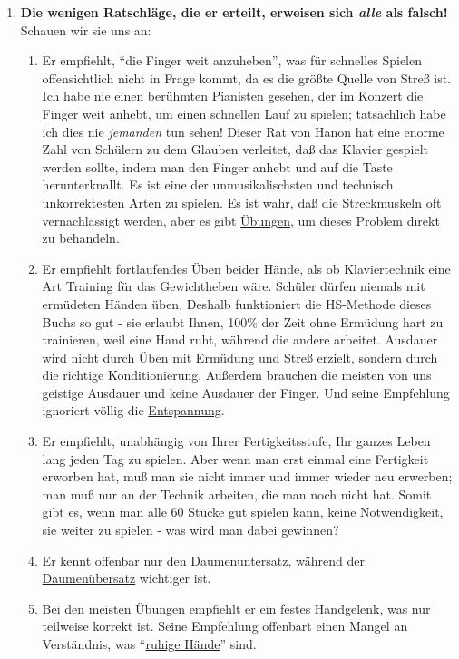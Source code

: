 \begin{enumerate}[label={\roman*.}]
\item \label{c1iii7h7}\textbf{Die wenigen Ratschläge, die er erteilt, erweisen sich \textit{alle} als falsch!}
Schauen wir sie uns an:

\begin{enumerate}[label={\alph*)}] 
\item Er empfiehlt, \enquote{die Finger weit anzuheben}, was für schnelles Spielen offensichtlich nicht in Frage kommt, da es die größte Quelle von Streß ist.
Ich habe nie einen berühmten Pianisten gesehen, der im Konzert die Finger weit anhebt, um einen schnellen Lauf zu spielen; tatsächlich habe ich dies nie \textit{jemanden} tun sehen!
Dieser Rat von Hanon hat eine enorme Zahl von Schülern zu dem Glauben verleitet, daß das Klavier gespielt werden sollte, indem man den Finger anhebt und auf die Taste herunterknallt.
Es ist eine der unmusikalischsten und technisch unkorrektesten Arten zu spielen.
Es ist wahr, daß die Streckmuskeln oft vernachlässigt werden, aber es gibt \hyperref[c1iii7finger]{Übungen}, um dieses Problem direkt zu behandeln.

\item Er empfiehlt fortlaufendes Üben beider Hände, als ob Klaviertechnik eine Art Training für das Gewichtheben wäre.
Schüler dürfen niemals mit ermüdeten Händen üben.
Deshalb funktioniert die HS-Methode dieses Buchs so gut - sie erlaubt Ihnen, 100\% der Zeit ohne Ermüdung hart zu trainieren, weil eine Hand ruht, während die andere arbeitet.
Ausdauer wird nicht durch Üben mit Ermüdung und Streß erzielt, sondern durch die richtige Konditionierung.
Außerdem brauchen die meisten von uns geistige Ausdauer und keine Ausdauer der Finger.
Und seine Empfehlung ignoriert völlig die \hyperref[c1ii14]{Entspannung}.

\item Er empfiehlt, unabhängig von Ihrer Fertigkeitsstufe, Ihr ganzes Leben lang jeden Tag zu spielen.
Aber wenn man erst einmal eine Fertigkeit erworben hat, muß man sie nicht immer und immer wieder neu erwerben; man muß nur an der Technik arbeiten, die man noch nicht hat.
Somit gibt es, wenn man alle 60 Stücke gut spielen kann, keine Notwendigkeit, sie weiter zu spielen - was wird man dabei gewinnen?

\item Er kennt offenbar nur den Daumenuntersatz, während der \hyperref[c1iii5a]{Daumenübersatz} wichtiger ist.

\item Bei den meisten Übungen empfiehlt er ein festes Handgelenk, was nur teilweise korrekt ist.
Seine Empfehlung offenbart einen Mangel an Verständnis, was \enquote{\hyperref[ruhig]{ruhige Hände}} sind.


\end{enumerate}
\end{enumerate}
